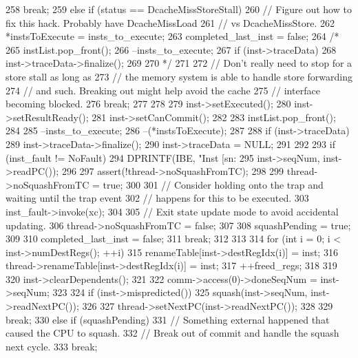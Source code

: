 \begin{DoxyCode}
{{{258             break;
259         } else if (status == DcacheMissStoreStall) {
260             // Figure out how to fix this hack.  Probably have DcacheMissLoad
261             // vs DcacheMissStore.
262             *instsToExecute = insts_to_execute;
263             completed_last_inst = false;
264 /*
265             instList.pop_front();
266             --insts_to_execute;
267             if (inst->traceData) {
268                 inst->traceData->finalize();
269             }
270 */
271 
272             // Don't really need to stop for a store stall as long as
273             // the memory system is able to handle store forwarding
274             // and such.  Breaking out might help avoid the cache
275             // interface becoming blocked.
276             break;
277         }
278 
279         inst->setExecuted();
280         inst->setResultReady();
281         inst->setCanCommit();
282 
283         instList.pop_front();
284 
285         --insts_to_execute;
286         --(*instsToExecute);
287 
288         if (inst->traceData) {
289             inst->traceData->finalize();
290             inst->traceData = NULL;
291         }
292 
293         if (inst_fault != NoFault) {
294             DPRINTF(IBE, "Inst [sn:%
295                     inst->seqNum, inst->readPC());
296 
297             assert(!thread->noSquashFromTC);
298 
299             thread->noSquashFromTC = true;
300 
301             // Consider holding onto the trap and waiting until the trap event
302             // happens for this to be executed.
303             inst_fault->invoke(xc);
304 
305             // Exit state update mode to avoid accidental updating.
306             thread->noSquashFromTC = false;
307 
308             squashPending = true;
309 
310             completed_last_inst = false;
311             break;
312         }
313 
314         for (int i = 0; i < inst->numDestRegs(); ++i) {
315             renameTable[inst->destRegIdx(i)] = inst;
316             thread->renameTable[inst->destRegIdx(i)] = inst;
317             ++freed_regs;
318         }
319 
320         inst->clearDependents();
321 
322         comm->access(0)->doneSeqNum = inst->seqNum;
323 
324         if (inst->mispredicted()) {
325             squash(inst->seqNum, inst->readNextPC());
326 
327             thread->setNextPC(inst->readNextPC());
328 
329             break;
330         } else if (squashPending) {
331             // Something external happened that caused the CPU to squash.
332             // Break out of commit and handle the squash next cycle.
333             break;
}}}
\end{DoxyCode}
